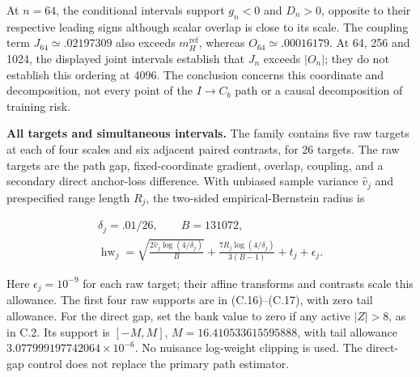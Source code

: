 \documentclass{article}
\begin{document}
At \(n=64\), the conditional intervals support \(g_n<0\) and \(D_n>0\),
opposite to their respective leading signs although scalar overlap is
close to its scale. The coupling term \(J_{64}\simeq.02197309\) also
exceeds \(m_H^{\mathrm{ref}}\), whereas \(O_{64}\simeq.00016179\). At
64, 256 and 1024, the displayed joint intervals establish that \(J_n\)
exceeds \(|O_n|\); they do not establish this ordering at 4096. The
conclusion concerns this coordinate and decomposition, not every point
of the \(I\to C_b\) path or a causal decomposition of training risk.

\textbf{All targets and simultaneous intervals.} The family contains
five raw targets at each of four scales and six adjacent paired
contrasts, for 26 targets. The raw targets are the path gap,
fixed-coordinate gradient, overlap, coupling, and a secondary direct
anchor-loss difference. With unbiased sample variance \(\widehat v_j\)
and prespecified range length \(R_j\), the two-sided empirical-Bernstein
radius is

\[
\begin{gathered}
\delta_j=.01/26,\qquad B=131072,\\
\operatorname{hw}_j=\sqrt{\frac{2\widehat v_j\log(4/\delta_j)}B}
+\frac{7R_j\log(4/\delta_j)}{3(B-1)}+t_j+\epsilon_j.
\end{gathered}
\tag{C.18}
\]

Here \(\epsilon_j=10^{-9}\) for each raw target; their affine transforms
and contrasts scale this allowance. The first four raw supports are in
(C.16)--(C.17), with zero tail allowance. For the direct gap, set the
bank value to zero if any active \(|Z|>8\), as in C.2. Its support is
\([-M,M]\), \(M=16.410533615595888\), with tail allowance
\(3.077999197742064\times10^{-6}\). No nuisance log-weight clipping is
used. The direct-gap control does not replace the primary path
estimator.
\end{document}
